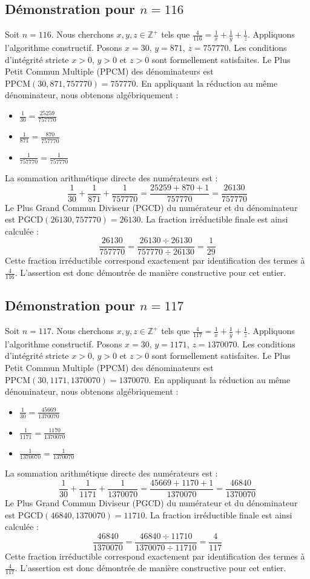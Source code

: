 \documentclass[11pt,a4paper]{article}
\begin{document}
\subsection{Démonstration pour $n = 116$}
Soit $n = 116$. Nous cherchons $x, y, z \in \mathbb{Z}^{+}$ tels que $\frac{4}{116} = \frac{1}{x} + \frac{1}{y} + \frac{1}{z}$.
Appliquons l'algorithme constructif. Posons $x = 30$, $y = 871$, $z = 757770$.
Les conditions d'intégrité stricte $x > 0$, $y > 0$ et $z > 0$ sont formellement satisfaites.
Le Plus Petit Commun Multiple (PPCM) des dénominateurs est $\text{PPCM}(30, 871, 757770) = 757770$.
En appliquant la réduction au même dénominateur, nous obtenons algébriquement :
\begin{itemize}
    \item $\frac{1}{30} = \frac{25259}{757770}$
    \item $\frac{1}{871} = \frac{870}{757770}$
    \item $\frac{1}{757770} = \frac{1}{757770}$
\end{itemize}
La sommation arithmétique directe des numérateurs est :
$$ \frac{1}{30} + \frac{1}{871} + \frac{1}{757770} = \frac{25259 + 870 + 1}{757770} = \frac{26130}{757770} $$
Le Plus Grand Commun Diviseur (PGCD) du numérateur et du dénominateur est $\text{PGCD}(26130, 757770) = 26130$.
La fraction irréductible finale est ainsi calculée :
$$ \frac{26130}{757770} = \frac{26130 \div 26130}{757770 \div 26130} = \frac{1}{29} $$
Cette fraction irréductible correspond exactement par identification des termes à $\frac{4}{116}$. L'assertion est donc démontrée de manière constructive pour cet entier.

\subsection{Démonstration pour $n = 117$}
Soit $n = 117$. Nous cherchons $x, y, z \in \mathbb{Z}^{+}$ tels que $\frac{4}{117} = \frac{1}{x} + \frac{1}{y} + \frac{1}{z}$.
Appliquons l'algorithme constructif. Posons $x = 30$, $y = 1171$, $z = 1370070$.
Les conditions d'intégrité stricte $x > 0$, $y > 0$ et $z > 0$ sont formellement satisfaites.
Le Plus Petit Commun Multiple (PPCM) des dénominateurs est $\text{PPCM}(30, 1171, 1370070) = 1370070$.
En appliquant la réduction au même dénominateur, nous obtenons algébriquement :
\begin{itemize}
    \item $\frac{1}{30} = \frac{45669}{1370070}$
    \item $\frac{1}{1171} = \frac{1170}{1370070}$
    \item $\frac{1}{1370070} = \frac{1}{1370070}$
\end{itemize}
La sommation arithmétique directe des numérateurs est :
$$ \frac{1}{30} + \frac{1}{1171} + \frac{1}{1370070} = \frac{45669 + 1170 + 1}{1370070} = \frac{46840}{1370070} $$
Le Plus Grand Commun Diviseur (PGCD) du numérateur et du dénominateur est $\text{PGCD}(46840, 1370070) = 11710$.
La fraction irréductible finale est ainsi calculée :
$$ \frac{46840}{1370070} = \frac{46840 \div 11710}{1370070 \div 11710} = \frac{4}{117} $$
Cette fraction irréductible correspond exactement par identification des termes à $\frac{4}{117}$. L'assertion est donc démontrée de manière constructive pour cet entier.
\end{document}
